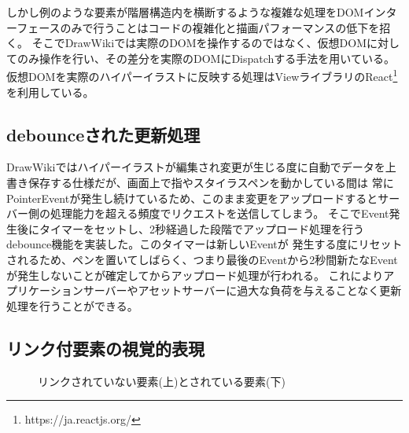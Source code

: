 しかし例のような要素が階層構造内を横断するような複雑な処理をDOMインターフェースのみで行うことはコードの複雑化と描画パフォーマンスの低下を招く。
そこでDrawWikiでは実際のDOMを操作するのではなく、仮想DOMに対してのみ操作を行い、その差分を実際のDOMにDispatchする手法を用いている。
仮想DOMを実際のハイパーイラストに反映する処理はViewライブラリのReact\footnote{https://ja.reactjs.org/}を利用している。

\subsection{debounceされた更新処理}
DrawWikiではハイパーイラストが編集され変更が生じる度に自動でデータを上書き保存する仕様だが、画面上で指やスタイラスペンを動かしている間は
常にPointerEventが発生し続けているため、このまま変更をアップロードするとサーバー側の処理能力を超える頻度でリクエストを送信してしまう。
そこでEvent発生後にタイマーをセットし、2秒経過した段階でアップロード処理を行うdebounce機能を実装した。このタイマーは新しいEventが
発生する度にリセットされるため、ペンを置いてしばらく、つまり最後のEventから2秒間新たなEventが発生しないことが確定してからアップロード処理が行われる。
これによりアプリケーションサーバーやアセットサーバーに過大な負荷を与えることなく更新処理を行うことができる。


\subsection{リンク付要素の視覚的表現}

\begin{figure}[htbp]
    \begin{center}
         \end{center}
    \caption{リンクされていない要素(上)とされている要素(下)} \label{linkedelm}
\end{figure}

